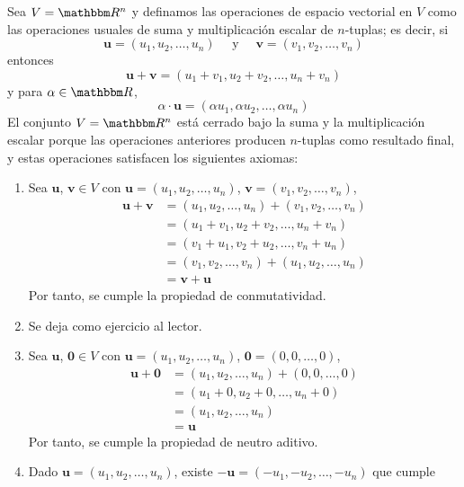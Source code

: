 \begin{examplebox}{}{}
    Sea $V = \RR[n]$ y definamos las operaciones de espacio vectorial en $V$ como las operaciones usuales de suma y multiplicación escalar de $n$-tuplas; es decir, si
    $$\mathbf{u} = (u_1, u_2, \dots, u_n) \quad \text{ y } \quad \mathbf{v} = (v_1, v_2, \dots, v_n)$$
    entonces
    $$\mathbf{u} + \mathbf{v} = (u_1 + v_1, u_2 + v_2, \dots, u_n + v_n)$$
    y para $\alpha \in \RR$,
    $$\alpha \cdot \mathbf{u} = (\alpha u_1, \alpha u_2, \dots, \alpha u_n)$$
    El conjunto $V = \RR[n]$ está cerrado bajo la suma y la multiplicación escalar porque las operaciones anteriores producen $n$-tuplas como resultado final, y estas operaciones satisfacen los siguientes axiomas:
    \begin{enumerate}[label=\roman*), topsep=6pt, itemsep=0pt]
        \item Sea $\mathbf{u}$, $\mathbf{v} \in V$ con $\mathbf{u} = (u_1, u_2, \dots, u_n)$, $\mathbf{v} = (v_1, v_2, \dots, v_n)$,
        \begin{align*}
            \mathbf{u} + \mathbf{v} & = (u_1, u_2, \dots, u_n) + (v_1, v_2, \dots, v_n) \\
            & = (u_1 + v_1, u_2 + v_2, \dots, u_n + v_n) \\
            & = (v_1 + u_1, v_2 + u_2, \dots, v_n + u_n) \\
            & = (v_1, v_2, \dots, v_n) + (u_1, u_2, \dots, u_n) \\
            & = \mathbf{v} + \mathbf{u}
        \end{align*}
        Por tanto, se cumple la propiedad de conmutatividad.
        \item Se deja como ejercicio al lector.
        \item Sea $\mathbf{u}$, $\mathbf{0} \in V$ con $\mathbf{u} = (u_1, u_2, \dots, u_n)$, $\mathbf{0} = (0, 0, \dots, 0)$,
        \begin{align*}
            \mathbf{u} + \mathbf{0} & = (u_1, u_2, \dots, u_n) + (0, 0, \dots, 0) \\
            & = (u_1 + 0, u_2 + 0, \dots, u_n + 0) \\
            & = (u_1, u_2, \dots, u_n) \\
            & = \mathbf{u}
        \end{align*}
        Por tanto, se cumple la propiedad de neutro aditivo.
        \newpage
        \item Dado $\mathbf{u} = (u_1, u_2, \dots, u_n)$, existe $-\mathbf{u} = (-u_1, -u_2, \dots, -u_n)$ que cumple

\end{enumerate}
\end{examplebox}
